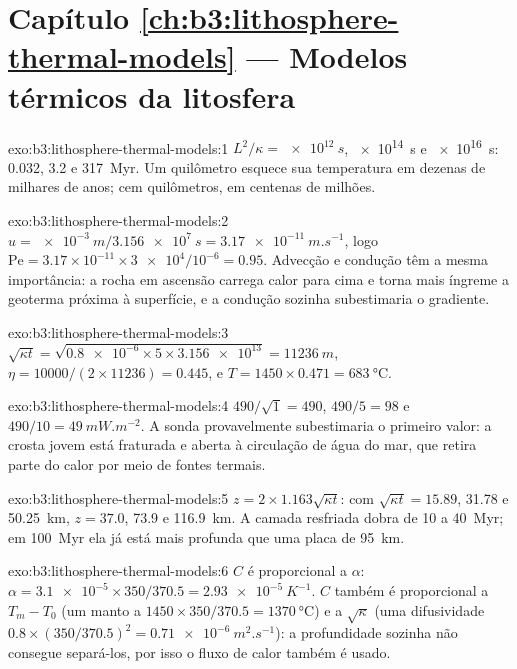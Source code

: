 \section*{Capítulo \ref{ch:b3:lithosphere-thermal-models} --- Modelos térmicos da litosfera}

\begin{solution}{exo:b3:lithosphere-thermal-models:1}
$L^2/\kappa = \qty{e12}{s}$, \qty{e14}{s} e \qty{e16}{s}: 0.032, 3.2 e
\qty{317}{Myr}. Um quilômetro esquece sua temperatura em dezenas de milhares de
anos; cem quilômetros, em centenas de milhões.
\end{solution}

\begin{solution}{exo:b3:lithosphere-thermal-models:2}
$u = \qty{e-3}{m}/\qty{3.156e7}{s} = \qty{3.17e-11}{m.s^{-1}}$, logo
$\mathrm{Pe} = 3.17\times10^{-11}\times\num{3e4}/10^{-6} = 0.95$. Advecção e
condução têm a mesma importância: a rocha em ascensão carrega calor para cima
e torna mais íngreme a geoterma próxima à superfície, e a condução sozinha
subestimaria o gradiente.
\end{solution}

\begin{solution}{exo:b3:lithosphere-thermal-models:3}
$\sqrt{\kappa t} = \sqrt{\num{0.8e-6}\times5\times\num{3.156e13}} =
\qty{11236}{m}$, $\eta = 10000/(2\times11236) = 0.445$, e $T = 1450\times0.471
= \qty{683}{\celsius}$.
\end{solution}

\begin{solution}{exo:b3:lithosphere-thermal-models:4}
$490/\sqrt1 = 490$, $490/5 = 98$ e $490/10 = \qty{49}{mW.m^{-2}}$. A sonda
provavelmente subestimaria o primeiro valor: a crosta jovem está fraturada e aberta
à circulação de água do mar, que retira parte do calor por meio de fontes termais.
\end{solution}

\begin{solution}{exo:b3:lithosphere-thermal-models:5}
$z = 2\times1.163\sqrt{\kappa t}$: com $\sqrt{\kappa t} = 15.89$, 31.78 e
\qty{50.25}{km}, $z = 37.0$, 73.9 e \qty{116.9}{km}. A camada resfriada dobra
de 10 a \qty{40}{Myr}; em \qty{100}{Myr} ela já está mais profunda que uma
placa de \qty{95}{km}.
\end{solution}

\begin{solution}{exo:b3:lithosphere-thermal-models:6}
$C$ é proporcional a $\alpha$: $\alpha = \num{3.1e-5}\times350/370.5 =
\qty{2.93e-5}{K^{-1}}$. $C$ também é proporcional a $T_m - T_0$ (um manto a
$1450\times350/370.5 = \qty{1370}{\celsius}$) e a $\sqrt\kappa$ (uma
difusividade $0.8\times(350/370.5)^2 = \qty{0.71e-6}{m^2.s^{-1}}$): a profundidade sozinha
não consegue separá-los, por isso o fluxo de calor também é usado.
\end{solution}

